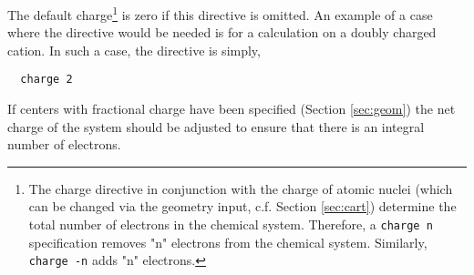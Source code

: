 The default charge\footnote{The charge directive in conjunction with
  the charge of atomic nuclei (which can be changed via the geometry
  input, c.f. Section \ref{sec:cart}) determine the total number of
  electrons in the chemical system.  Therefore, a \verb+charge n+
  specification removes "n" electrons from the chemical system.
  Similarly, \verb+charge -n+ adds "n" electrons.} is zero
if this directive is omitted.  An example of a case where the
directive would be needed is for a calculation on a doubly charged
cation.  In such a case, the directive is simply,
\begin{verbatim}
  charge 2
\end{verbatim}

If centers with fractional charge have been specified (Section
\ref{sec:geom}) the net charge of the system should be adjusted to
ensure that there is an integral number of electrons.



